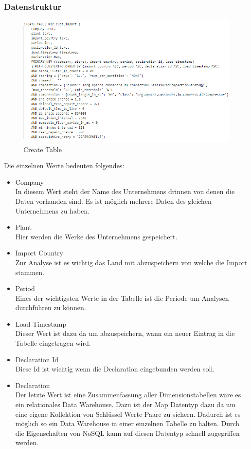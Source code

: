 \subsubsection{Datenstruktur}
\begin{figure}[H]
\centering
  \includegraphics[scale=0.5]{images/Cassandra_Create_Table.PNG}
  \caption[Create Table]{Create Table}
  \label{fig:Create-Table}
\end{figure}
Die einzelnen Werte bedeuten folgendes:
\begin{itemize}
\item{Company}\mbox{}\\
In diesem Wert steht der Name des Unternehmens drinnen von denen die Daten vorhanden sind. Es ist möglich mehrere Daten des gleichen Unternehmens zu haben. 
\item{Plant}\mbox{}\\
Hier werden die Werke des Unternehmens gespeichert.
\item{Import Country}\mbox{}\\
Zur Analyse ist es wichtig das Land mit abzuspeichern von welche die Import stammen. 
\item{Period}\mbox{}\\
Eines der wichtigsten Werte in der Tabelle ist die Periode um Analysen durchführen zu können. 
\item{Load Timestamp}\mbox{}\\
Dieser Wert ist dazu da um abzuspeichern, wann ein neuer Eintrag in die Tabelle eingetragen wird.
\item{Declaration Id}\mbox{}\\
Diese Id ist wichtig wenn die Declaration eingebunden werden soll.
\item{Declaration}\mbox{}\\
Der letzte Wert ist eine Zusammenfassung aller Dimensionstabellen wäre es ein relationales Data Warehouse. Dazu ist der Map Datentyp dazu da um eine eigene Kollektion von Schlüssel Werte Paare zu sichern. Dadurch ist es möglich so ein Data Warehouse in einer einzelnen Tabelle zu halten. Durch die Eigenschaften von NoSQL kann auf diesen Datentyp schnell zugegriffen werden. 
\end{itemize}
\newpage
